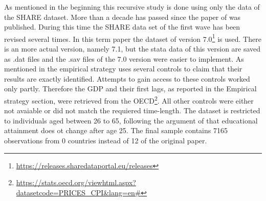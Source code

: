 \documentclass[12pt,a4paper]{article}
\let\rmarkdownfootnote\footnote%
\def\footnote{\protect\rmarkdownfootnote}
\begin{document}
As mentioned in the beginning this recursive study is done using only
the data of the SHARE dataset. More than a decade has passed since the
paper of \textcite{brunello} was published. During this time the SHARE
data set of the first wave has been revised several times. In this term
paper the dataset of version 7.0\footnote{\url{https://releases.sharedataportal.eu/releases}}
is used. There is an more actual version, namely 7.1, but the stata data
of this version are saved as .dat files and the .sav files of the 7.0
version were easier to implement. As mentioned in the empirical strategy
\textcite{brunello} uses several controls to claim that their results
are exactly identified. Attempts to gain access to these controls worked
only partly. Therefore the GDP and their first lags, as reported in the
Empirical strategy section, were retrieved from the OECD\footnote{\url{https://stats.oecd.org/viewhtml.aspx?datasetcode=PRICES_CPI\&lang=en\#}}.
All other controls were either not avaiable or did not match the
requiered time-length. The dataset is restricted to individuals aged
between 26 to 65, following the argument of \textcite{brunello} that
educational attainment does ot change after age 25. The final sample
contains 7165 observations from 0 countries instead of 12 of the
original paper.
\end{document}
